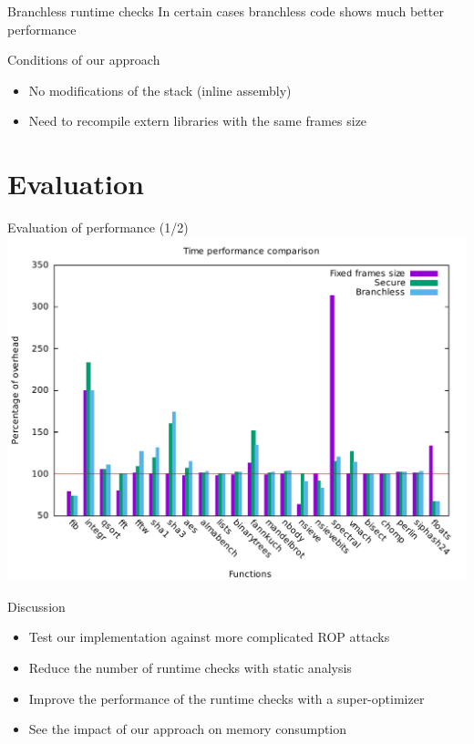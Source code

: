 \documentclass{beamer}
\begin{document}
\begin{frame}{Branchless runtime checks}
	In certain cases  branchless code shows much better performance
	\Branchless
\end{frame}


\begin{frame}[c]{Conditions of our approach}
	\begin{itemize}
		\item No modifications of the stack (inline assembly)
			\Inline
		\item Need to recompile extern libraries with the same frames size
	\end{itemize}
\end{frame}

\section{Evaluation}
\label{sec:Implementation}

\begin{frame}[c]{Evaluation of performance (1/2)}
	\includegraphics[width=\textwidth]{images/time_percentage_graph.pdf}
\end{frame}

\begin{frame}[c]{Discussion}
	\begin{itemize}
		\item Test our implementation against more complicated ROP attacks
		\item Reduce the number of runtime checks with static analysis
		\item Improve the performance of the runtime checks with a super-optimizer
		\item See the impact of our approach on memory consumption
	\end{itemize}
\end{frame}

 
\end{document}
